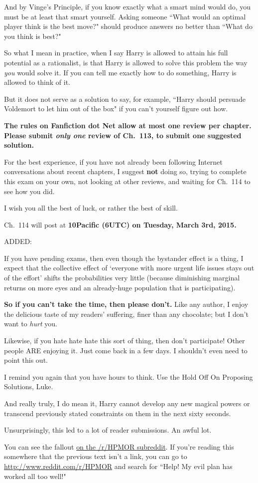 {And by Vinge's Principle, if you know exactly what a smart mind would do, you must be at least that smart yourself. Asking someone ``What would an optimal player think is the best move?" should produce answers no better than ``What do you think is best?"

So what I mean in practice, when I say Harry is allowed to attain his full potential as a rationalist, is that Harry is allowed to solve this problem the way \emph{you} would solve it. If you can tell me exactly how to do something, Harry is allowed to think of it.

But it does not serve as a solution to say, for example, ``Harry should persuade Voldemort to let him out of the box" if you can't yourself figure out how.

\textbf{The rules on Fanfiction dot Net allow at most one review per chapter. Please submit \emph{only one} review of Ch.~113, to submit one suggested solution.}

For the best experience, if you have not already been following Internet conversations about recent chapters, I suggest \textbf{not} doing so, trying to complete this exam on your own, not looking at other reviews, and waiting for Ch.~114 to see how you did.

I wish you all the best of luck, or rather the best of skill.

Ch.~114 will post at \textbf{10\am Pacific (6\pm UTC) on Tuesday, March 3rd, 2015.}

ADDED:

If you have pending exams, then even though the bystander effect is a thing, I expect that the collective effect of `everyone with more urgent life issues stays out of the effort' shifts the probabilities very little (because diminishing marginal returns on more eyes and an already-huge population that is participating).

\textbf{So if you can't take the time, then please don't.} Like any author, I enjoy the delicious taste of my readers' suffering, finer than any chocolate; but I don't want to \emph{hurt} you.

Likewise, if you hate hate hate this sort of thing, then don't participate! Other people ARE enjoying it. Just come back in a few days. I shouldn't even need to point this out.

I remind you again that you have hours to think. Use the Hold Off On Proposing Solutions, Luke.

And really truly, I do mean it, Harry cannot develop any new magical powers or transcend previously stated constraints on them in the next sixty seconds.

\later

Unsurprisingly, this led to a lot of reader submissions. An awful lot.

You can see the fallout \href{http://www.reddit.com/r/HPMOR/comments/2xnyi0/113_help_my_evil_plan_has_worked_all_too_well/}{on the /r/HPMOR subreddit}. If you're reading this somewhere that the previous text isn't a link, you can go to \url{http://www.reddit.com/r/HPMOR} and search for ``Help! My evil plan has worked all too well!"

}
